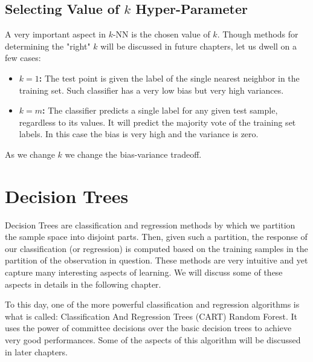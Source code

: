 \subsection{Selecting Value of $k$ Hyper-Parameter}
A very important aspect in $k$-NN is the chosen value of $k$. Though methods for determining the "right" $k$ will be discussed in future chapters, let us dwell on a few cases:
\begin{itemize}
	\item \textbf{$k=1$:} The test point is given the label of the single nearest neighbor in the training set. Such classifier has a very low bias but very high variances.
	\item \textbf{$k=m$:} The classifier predicts a single label for any given test sample, regardless to its values. It will predict the majority vote of the training set labels. In this case the bias is very high and the variance is zero.
\end{itemize}


As we change $k$ we change the bias-variance tradeoff. 



\section{Decision Trees}
Decision Trees are classification and regression methods by which we partition the sample space into disjoint parts. Then, given such a partition, the response of our classification (or regression) is computed based on the training samples in the partition of the observation in question. These methods are very intuitive and yet capture many interesting aspects of learning. We will discuss some of these aspects in details in the following chapter.

\begin{remark}
	To this day, one of the more powerful classification and regression algorithms is what is called: Classification And Regression Trees (CART) Random Forest. It uses the power of committee decisions over the basic decision trees to achieve very good performances. Some of the aspects of this algorithm will be discussed in later chapters.
\end{remark}

